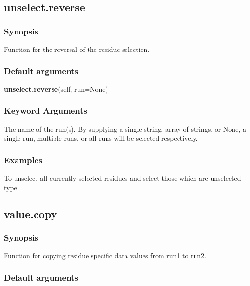 \subsection{unselect.reverse}


\subsubsection{Synopsis}

Function for the reversal of the residue selection.

\subsubsection{Default arguments}

\textsf{\textbf{unselect.reverse}(self, run=None)}


\subsubsection{Keyword Arguments}

  The name of the run(s).  By supplying a single string, array of strings, or None, a single run, multiple runs, or all runs will be selected respectively.

\subsubsection{Examples}

To unselect all currently selected residues and select those which are unselected type:




\newpage

\subsection{value.copy}


\subsubsection{Synopsis}

Function for copying residue specific data values from run1 to run2.

\subsubsection{Default arguments}

